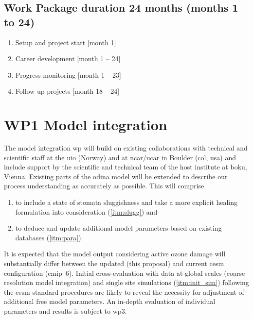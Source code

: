 \subsection*{Work Package duration 24 months (months 1 to 24)}
\begin{enumerate}[start=1,label={T0.\arabic*}]
  \itemsep0pt
\item Setup and project start \hfill [month 1]\label{itm:start}
\item Career development \hfill [month 1 -- 24]\label{itm:career_dev}
\item Progress monitoring \hfill [month 1 -- 23]\label{itm:progress}
\item Follow-up projects \hfill [month 18 -- 24]\label{itm:followup}
\end{enumerate}

\vspace{-1\baselineskip}
\section{WP1 Model integration}
\label{sec:wp1}
The model integration \gls{wp} will build on existing collaborations with technical and scientific staff at the \gls{uio} (Norway) and at \gls{ncar/ucar} in Boulder (\acrshort{col}, \acrshort{usa}) and include support by the scientific and technical team of the host institute at \gls{boku}, Vienna. Existing parts of the \gls{odina} model will be extended to describe our process understanding as accurately as possible. This will comprise
\begin{enumerate}
  \itemsep0pt
\item to include a state of stomata sluggishness and take a more explicit healing formulation into consideration (\ref{itm:slugg}) and
\item to deduce and update additional model parameters based on existing databases (\ref{itm:para}).
\end{enumerate}
It is expected that the model output considering active ozone damage will substantially differ between the updated (this proposal) and current \gls{cesm} configuration (\gls{cmip}~6). Initial cross-evaluation with data at global scales (coarse resolution model integration) and single site simulations (\ref{itm:init_sim}) following the \gls{cesm} standard procedures are likely to reveal the necessity for adjustment of additional free model parameters. An in-depth evaluation of individual parameters and results is subject to \gls{wp}3.

\vspace{-0.5\baselineskip}

